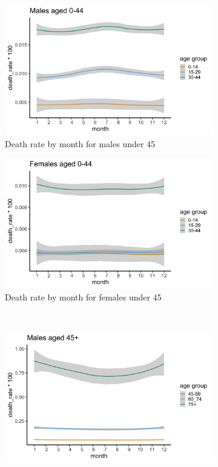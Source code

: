 \documentclass[11pt]{article}
\begin{document}
\begin{figure}
\centering
\begin{subfigure}[t]{0.49\textwidth}
\centering
\includegraphics[scale=0.076]{figs/young_men.png}
\caption{Death rate by month for males under 45}
\label{fig:young_men}
\end{subfigure}
\begin{subfigure}[t]{0.49\textwidth}
\centering
\includegraphics[scale=0.076]{figs/young_women.png}
\caption{Death rate by month for females under 45}
\label{fig:young_women}
\end{subfigure}
\\
\begin{subfigure}[t]{0.49\textwidth}
\centering
\includegraphics[scale=0.076]{figs/old_men.png}

\end{subfigure}
\end{figure}
\end{document}
